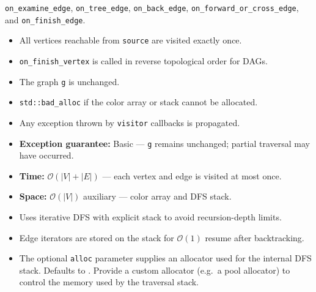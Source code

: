 \begin{itemdescr}
\begin{itemize}
                        \lstinline{on_examine_edge}, \lstinline{on_tree_edge}, \lstinline{on_back_edge},
                        \lstinline{on_forward_or_cross_edge}, and \lstinline{on_finish_edge}.
            \end{itemize}
      \pnum\postconditions
            \begin{itemize}
                  \item All vertices reachable from \lstinline{source} are visited exactly once.
                  \item \lstinline{on_finish_vertex} is called in reverse topological order for DAGs.
                  \item The graph \lstinline{g} is unchanged.
            \end{itemize}
      \pnum\throws
            \begin{itemize}
                  \item \lstinline{std::bad_alloc} if the color array or stack cannot be allocated.
                  \item Any exception thrown by \lstinline{visitor} callbacks is propagated.
                  \item \textbf{Exception guarantee:} Basic --- \lstinline{g} remains unchanged;
                        partial traversal may have occurred.
            \end{itemize}
      \pnum\complexity
            \begin{itemize}
                  \item \textbf{Time:} $\mathcal{O}(|V| + |E|)$ --- each vertex and edge is visited at most once.
                  \item \textbf{Space:} $\mathcal{O}(|V|)$ auxiliary --- color array and DFS stack.
            \end{itemize}
      \pnum\remarks
            \begin{itemize}
                  \item Uses iterative DFS with explicit stack to avoid recursion-depth limits.
                  \item Edge iterators are stored on the stack for $\mathcal{O}(1)$ resume after backtracking.
                  \item The optional \lstinline{alloc} parameter supplies an allocator used for
                        the internal DFS stack.  Defaults to .
                        Provide a custom allocator (e.g.~a pool allocator) to control the memory
                        used by the traversal stack.
            \end{itemize}
\end{itemdescr}

